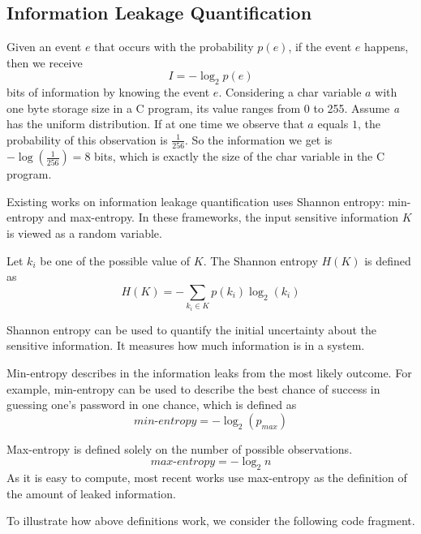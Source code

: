 \subsection{Information Leakage Quantification}
 
Given an event $e$ that occurs with the probability $p(e)$, if the event $e$ happens, 
then we receive
\begin{displaymath}
    I = - \log_2p(e)
\end{displaymath}
bits of information by knowing the event $e$.
Considering a char variable $a$ with one byte storage size in a C program, its value 
ranges from 0 to 255.  Assume
 \textit{a} has the uniform distribution. If at one time we observe that $a$
equals $1$, the probability of this observation is $\frac{1}{256}$. So the information we get is 
$-\log(\frac{1}{256}) = 8$ bits, which is exactly the size of the char variable in the C program.

Existing works on information leakage quantification uses Shannon entropy: 
min-entropy \cite{10.1007/978-3-642-00596-1_21} and max-entropy.
In these frameworks, the input sensitive
information $K$ is viewed as a random variable. 

Let $k_i$ be one of the possible
value of $K$. The Shannon entropy $H(K)$ is defined as
\begin{displaymath}
    H(K) = - \sum_{k_i {\in} K}p(k_i)\log_2(k_i)
\end{displaymath}

Shannon entropy can be used to quantify the initial uncertainty about the sensitive
information. It measures how much information is in a system.

Min-entropy describes in the information leaks from the most likely outcome.
For example, min-entropy can be used to describe the best chance of success in guessing 
one's password in one chance, which is defined as 
\begin{displaymath}
    \mathit{min\text{-}entropy} = - \log_2(p_{max})
\end{displaymath}

Max-entropy is defined solely on the number of possible observations. 
\begin{displaymath}
    \mathit{max\text{-}entropy} = -\log_2{n}
\end{displaymath}
As it is easy to compute, most recent works use 
max-entropy as the definition of the amount of leaked information.

To illustrate how above definitions work, we consider the following
code fragment. 

